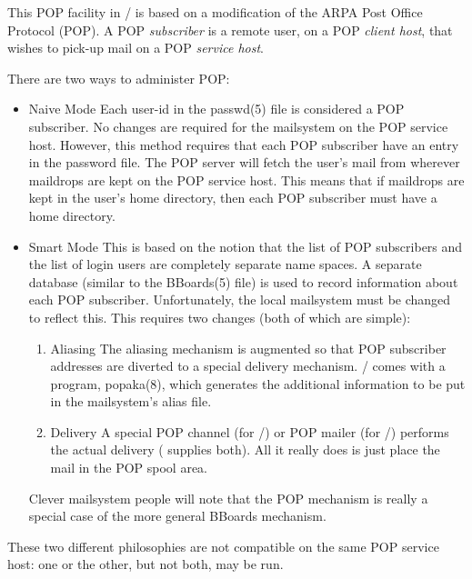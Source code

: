 This POP facility in \MH/ is based on a modification of the ARPA Post
Office Protocol (POP).
A POP {\em subscriber\/} is a remote user,
on a POP {\em client host},
that wishes to pick-up mail on a POP {\em service host}.

There are two ways to administer POP:
\begin{itemize}
\item	Naive Mode\hbreak
Each user-id in the \man passwd(5) file is considered a POP subscriber.
No changes are required for the mailsystem on the POP service host.
However,
this method requires that each POP subscriber have an entry in the password
file.
The POP server will fetch the user's mail from wherever maildrops are kept on
the POP service host.
This means that if maildrops are kept in the user's home directory,
then each POP subscriber must have a home directory.

\item	Smart Mode\hbreak
This is based on the notion that the list of POP subscribers and the list of
login users are completely separate name spaces.
A separate database (similar to the \man BBoards(5) file)
is used to record information about each POP subscriber.
Unfortunately,
the local mailsystem must be changed to reflect this.
This requires two changes (both of which are simple):
\begin{enumerate}
\item	Aliasing\hbreak
	The aliasing mechanism is augmented so that POP subscriber addresses
	are diverted to a special delivery mechanism.
	\MH/ comes with a program, \man popaka(8), which generates the
	additional information to be put in the mailsystem's alias file.
\item	Delivery\hbreak
	A special POP channel (for \MMDFII/) or POP mailer (for \SendMail/)
	performs the actual delivery ( supplies both).
	All it really does is just place the mail in the POP spool area.
\end{enumerate}
Clever mailsystem people will note that
the POP mechanism is really a special case of the more general
BBoards mechanism.
\end{itemize}
These two different philosophies are not compatible on the same POP service
host: one or the other, but not both, may be run.

